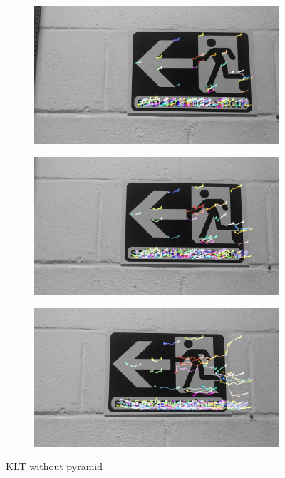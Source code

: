 \begin{figure}[!h]
	\hspace{-1cm}
	\begin{subfigure}{0.33\textwidth}
	  \centering
	  \includegraphics[width=0.99\linewidth]{figs/flowSP-1.jpg}
	\end{subfigure}%
	\begin{subfigure}{0.33\textwidth}
	  \centering
	  \includegraphics[width=0.99\linewidth]{figs/flowSP-2.jpg}
	\end{subfigure}%
	\begin{subfigure}{0.33\textwidth}
        \centering
      \includegraphics[width=0.99\linewidth]{figs/flowSP-3.jpg}
    \end{subfigure} 
    \endminipage\hfill 
    \caption{KLT without pyramid}
    \label{fig:comparison-KLP-pyramid1}
\end{figure}

